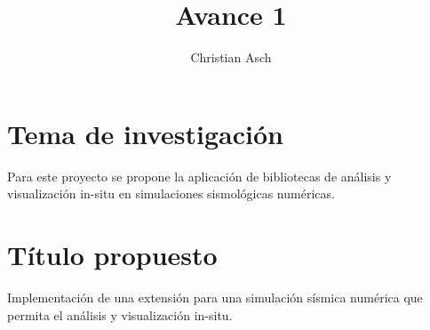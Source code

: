\documentclass{article}
\begin{document}
\title{Avance 1}
\author{Christian Asch}
\date{}
\maketitle
\section{Tema de investigación}
 Para este proyecto se propone la aplicación de bibliotecas de análisis y visualización in-situ en simulaciones sismológicas numéricas.
\section{Título propuesto}
Implementación de una extensión para una simulación sísmica numérica que permita el análisis y visualización in-situ.
\end{document}

